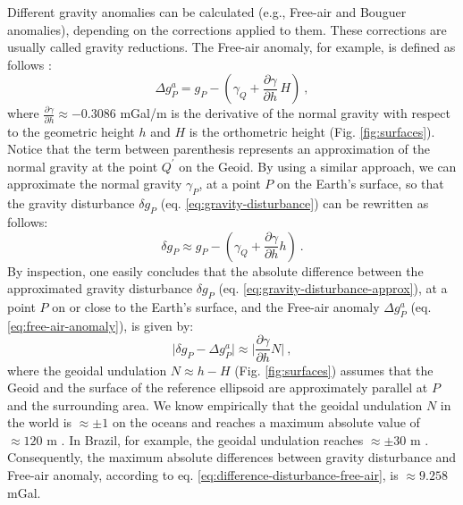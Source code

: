 \documentclass[extra]{gji}
\begin{document}
Different gravity anomalies can be calculated (e.g., Free-air and 
Bouguer anomalies), depending on the corrections applied to 
them. These corrections are usually called gravity reductions. 
The Free-air anomaly, for example, is defined as follows 
\citep{blakely1996, hofmann-wellenhof-moritz2005}:
\begin{equation}
\Delta g_{P}^{a} 
= g_{P} - \left( \gamma_{Q} + \frac{\partial \gamma}{\partial h} \, H \right)
\: ,
\label{eq:free-air-anomaly}
\end{equation}
where $\frac{\partial \gamma}{\partial h} \approx -0.3086$ mGal/m is the
derivative of the normal gravity with respect to the geometric height $h$
and $H$ is the orthometric height (Fig. \ref{fig:surfaces}). 
Notice that the term between parenthesis represents an 
approximation of the normal gravity at the point $Q^{\prime}$ on the
Geoid. By using a similar approach, we can approximate the normal gravity
$\gamma_{P}$, at a point $P$ on the Earth's surface, so that the 
gravity disturbance $\delta g_{P}$ (eq. \ref{eq:gravity-disturbance}) 
can be rewritten as follows:
\begin{equation}
\delta g_{P} \approx g_{P} - 
\left( \gamma_{Q} + \frac{\partial \gamma}{\partial h} h \right) \: .
\label{eq:gravity-disturbance-approx}
\end{equation}
By inspection, one easily concludes that the absolute difference 
between the approximated gravity disturbance $\delta g_{P}$ 
(eq. \ref{eq:gravity-disturbance-approx}), at a point $P$ on or close to
the Earth's surface, and the Free-air anomaly
$\Delta g_{P}^{a}$ (eq. \ref{eq:free-air-anomaly}), is given by:
\begin{equation}
\vert \delta g_{P} - \Delta g^{a}_{P} \vert \approx 
\vert \frac{\partial \gamma}{\partial h} N \vert \: ,
\label{eq:difference-disturbance-free-air}
\end{equation}
where the geoidal undulation $N \approx h - H$ (Fig. \ref{fig:surfaces}) assumes 
that the Geoid and the surface of the reference ellipsoid 
are approximately parallel at $P$ and the surrounding area.
We know empirically that the geoidal undulation $N$ in the world 
is $\approx \pm 1$ on the oceans and reaches a 
maximum absolute value of $\approx 120$ m \citep[e.g.,][]{torge2012, 
sanso_sideris2013}. In Brazil, for example, the geoidal undulation 
reaches $\approx \pm 30$ m \citep{ibge_mapgeo2015}. Consequently, the
maximum absolute differences between gravity disturbance and
Free-air anomaly, according to eq. \ref{eq:difference-disturbance-free-air},
is $\approx 9.258$ mGal.
\end{document}
